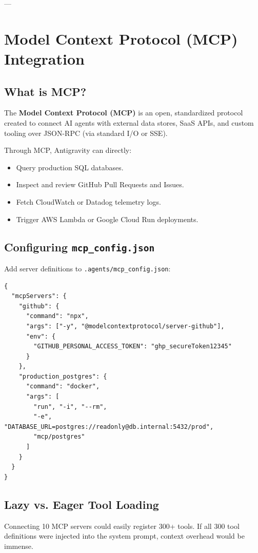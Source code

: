 \documentclass[11pt,a4paper,oneside]{book}
\begin{document}
---

\chapter{Model Context Protocol (MCP) Integration}

\section{What is MCP?}
The \textbf{Model Context Protocol (MCP)} is an open, standardized protocol created to connect AI agents with external data stores, SaaS APIs, and custom tooling over JSON-RPC (via standard I/O or SSE).

Through MCP, Antigravity can directly:
\begin{itemize}
    \item Query production SQL databases.
    \item Inspect and review GitHub Pull Requests and Issues.
    \item Fetch CloudWatch or Datadog telemetry logs.
    \item Trigger AWS Lambda or Google Cloud Run deployments.
\end{itemize}

\section{Configuring \texttt{mcp\_config.json}}
Add server definitions to \texttt{.agents/mcp\_config.json}:

\begin{lstlisting}[caption={Connecting external tools via MCP}]
{
  "mcpServers": {
    "github": {
      "command": "npx",
      "args": ["-y", "@modelcontextprotocol/server-github"],
      "env": {
        "GITHUB_PERSONAL_ACCESS_TOKEN": "ghp_secureToken12345"
      }
    },
    "production_postgres": {
      "command": "docker",
      "args": [
        "run", "-i", "--rm",
        "-e", "DATABASE_URL=postgres://readonly@db.internal:5432/prod",
        "mcp/postgres"
      ]
    }
  }
}
\end{lstlisting}

\section{Lazy vs. Eager Tool Loading}
Connecting 10 MCP servers could easily register 300+ tools. If all 300 tool definitions were injected into the system prompt, context overhead would be immense.
\end{document}
